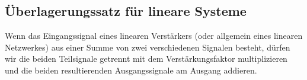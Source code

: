 	\subsection{Überlagerungssatz für lineare Systeme}
			Wenn das Eingangssignal eines linearen Verstärkers (oder allgemein eines
			linearen Netzwerkes) aus einer Summe von zwei verschiedenen Signalen besteht,
			dürfen wir die beiden Teilsignale getrennt mit dem Verstärkungsfaktor
			multiplizieren und die beiden resultierenden Ausgangssignale am Ausgang
			addieren.\\
			\hspace*{10mm}
			\\
